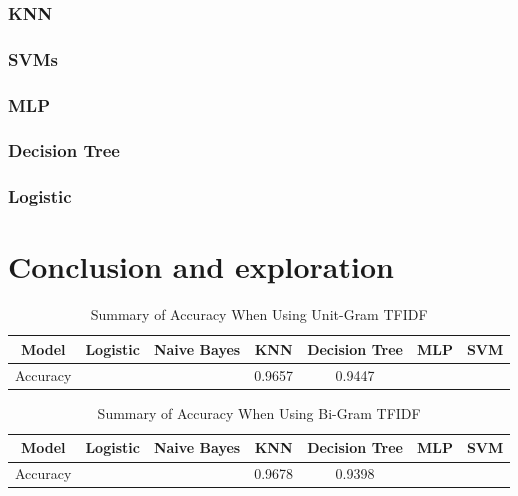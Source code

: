 \documentclass[12pt]{article}
\begin{document}
\subsubsection{KNN}

\subsubsection{SVMs}

\subsubsection{MLP}
\subsubsection{Decision Tree}

\subsubsection{Logistic}


\section{Conclusion and exploration}


\begin{table}[H]
	\centering
	\caption{Summary of Accuracy When Using Unit-Gram TFIDF}
	\label{Summary_one_gram}
	\begin{tabular}{@{}ccccccc@{}}
		\toprule
		Model    & Logistic & Naive Bayes & KNN    & Decision Tree & MLP & SVM \\ \midrule
		Accuracy &          &             & 0.9657 & 0.9447        &     &     \\ \bottomrule
	\end{tabular}
\end{table}


\begin{table}[H]
	\centering
	\caption{Summary of Accuracy When Using Bi-Gram TFIDF}
	\label{Summary_bi_gram}
	\begin{tabular}{@{}ccccccc@{}}
		\toprule
		Model    & Logistic & Naive Bayes & KNN    & Decision Tree & MLP & SVM \\ \midrule
		Accuracy &          &             & 0.9678 & 0.9398        &     &     \\ \bottomrule
	\end{tabular}
\end{table}
\end{document}
